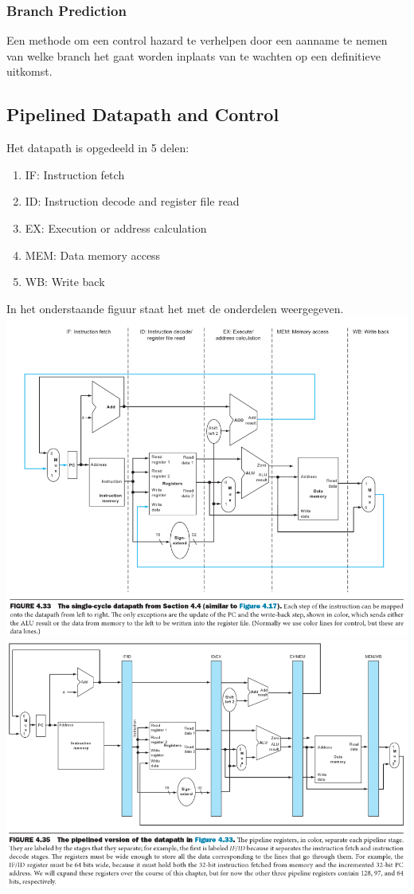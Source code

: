 	\subsubsection*{Branch Prediction}
	Een methode om een control hazard te verhelpen door een aanname te nemen van welke branch het gaat worden inplaats van te wachten op een definitieve uitkomst.
	\subsection{Pipelined Datapath and Control}
	Het datapath is opgedeeld in 5 delen:
	\begin{enumerate}
		\item IF: Instruction fetch
		\item ID: Instruction decode and register file read
		\item EX: Execution or address calculation
		\item MEM: Data memory access
		\item WB: Write back
	\end{enumerate}
	In het onderstaande figuur staat het met de onderdelen weergegeven.\\
	\includegraphics[scale=0.6]{Fig4_33.png}\\
	\includegraphics[scale=0.6]{Fig4_35.png}\\

